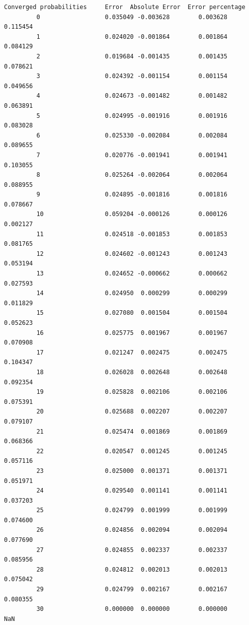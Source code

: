 \documentclass[11pt]{article}
\begin{document}
\begin{Verbatim}[commandchars=\\\{\}]
             Converged probabilities     Error  Absolute Error  Error percentage  
         0                  0.035049 -0.003628        0.003628          0.115454  
         1                  0.024020 -0.001864        0.001864          0.084129  
         2                  0.019684 -0.001435        0.001435          0.078621  
         3                  0.024392 -0.001154        0.001154          0.049656  
         4                  0.024673 -0.001482        0.001482          0.063891  
         5                  0.024995 -0.001916        0.001916          0.083028  
         6                  0.025330 -0.002084        0.002084          0.089655  
         7                  0.020776 -0.001941        0.001941          0.103055  
         8                  0.025264 -0.002064        0.002064          0.088955  
         9                  0.024895 -0.001816        0.001816          0.078667  
         10                 0.059204 -0.000126        0.000126          0.002127  
         11                 0.024518 -0.001853        0.001853          0.081765  
         12                 0.024602 -0.001243        0.001243          0.053194  
         13                 0.024652 -0.000662        0.000662          0.027593  
         14                 0.024950  0.000299        0.000299          0.011829  
         15                 0.027080  0.001504        0.001504          0.052623  
         16                 0.025775  0.001967        0.001967          0.070908  
         17                 0.021247  0.002475        0.002475          0.104347  
         18                 0.026028  0.002648        0.002648          0.092354  
         19                 0.025828  0.002106        0.002106          0.075391  
         20                 0.025688  0.002207        0.002207          0.079107  
         21                 0.025474  0.001869        0.001869          0.068366  
         22                 0.020547  0.001245        0.001245          0.057116  
         23                 0.025000  0.001371        0.001371          0.051971  
         24                 0.029540  0.001141        0.001141          0.037203  
         25                 0.024799  0.001999        0.001999          0.074600  
         26                 0.024856  0.002094        0.002094          0.077690  
         27                 0.024855  0.002337        0.002337          0.085956  
         28                 0.024812  0.002013        0.002013          0.075042  
         29                 0.024799  0.002167        0.002167          0.080355  
         30                 0.000000  0.000000        0.000000               NaN  

\end{Verbatim}
\end{document}
